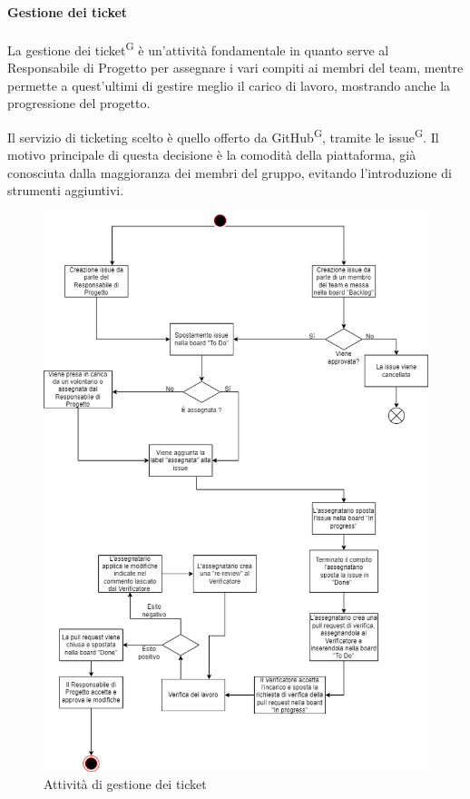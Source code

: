 \paragraph{Gestione dei ticket}
La gestione dei ticket\textsuperscript{G} è un'attività fondamentale in quanto serve al Responsabile di Progetto per assegnare i vari compiti ai membri del team, mentre permette a quest'ultimi di gestire meglio il carico di lavoro, mostrando anche la progressione del progetto.

Il servizio di ticketing scelto è quello offerto da GitHub\textsuperscript{G}, tramite le issue\textsuperscript{G}. Il motivo principale di questa decisione è la comodità della piattaforma, già conosciuta dalla maggioranza dei membri del gruppo, evitando l'introduzione di strumenti aggiuntivi.

\begin{figure}[!h]
\centering
\includegraphics[scale=0.5]{Contenuto/Immagini/ticket.png}
\caption{Attività di gestione dei ticket}
\end{figure}

